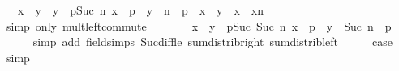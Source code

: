\begin{isabellebody}
\ {\isachardoublequoteopen}{\isachardot}{\kern0pt}{\isachardot}{\kern0pt}{\isachardot}{\kern0pt}\ {\isacharequal}{\kern0pt}\ {\isacharparenleft}{\kern0pt}x\ {\isacharminus}{\kern0pt}\ y{\isacharparenright}{\kern0pt}\ {\isacharasterisk}{\kern0pt}\ {\isacharparenleft}{\kern0pt}y\ {\isacharasterisk}{\kern0pt}\ {\isacharparenleft}{\kern0pt}{\isasymSum}p{\isacharless}{\kern0pt}Suc\ n{\isachardot}{\kern0pt}\ {\isacharparenleft}{\kern0pt}x\ {\isacharcircum}{\kern0pt}\ p{\isacharparenright}{\kern0pt}\ {\isacharasterisk}{\kern0pt}\ y\ {\isacharcircum}{\kern0pt}\ {\isacharparenleft}{\kern0pt}n\ {\isacharminus}{\kern0pt}\ p{\isacharparenright}{\kern0pt}{\isacharparenright}{\kern0pt}{\isacharparenright}{\kern0pt}\ {\isacharplus}{\kern0pt}\ {\isacharparenleft}{\kern0pt}x\ {\isacharminus}{\kern0pt}\ y{\isacharparenright}{\kern0pt}\ {\isacharasterisk}{\kern0pt}\ {\isacharparenleft}{\kern0pt}x\ {\isacharasterisk}{\kern0pt}\ x{\isacharcircum}{\kern0pt}n{\isacharparenright}{\kern0pt}{\isachardoublequoteclose}\isanewline
\ \ \ \ \isamarkupfalse%
\ {\isacharparenleft}{\kern0pt}simp\ only{\isacharcolon}{\kern0pt}\ mult{\isachardot}{\kern0pt}left{\isacharunderscore}{\kern0pt}commute{\isacharparenright}{\kern0pt}\isanewline
\ \ \isamarkupfalse%
\ \isamarkupfalse%
\ {\isachardoublequoteopen}{\isachardot}{\kern0pt}{\isachardot}{\kern0pt}{\isachardot}{\kern0pt}\ {\isacharequal}{\kern0pt}\ {\isacharparenleft}{\kern0pt}x\ {\isacharminus}{\kern0pt}\ y{\isacharparenright}{\kern0pt}\ {\isacharasterisk}{\kern0pt}\ {\isacharparenleft}{\kern0pt}{\isasymSum}p{\isacharless}{\kern0pt}Suc\ {\isacharparenleft}{\kern0pt}Suc\ n{\isacharparenright}{\kern0pt}{\isachardot}{\kern0pt}\ x\ {\isacharcircum}{\kern0pt}\ p\ {\isacharasterisk}{\kern0pt}\ y\ {\isacharcircum}{\kern0pt}\ {\isacharparenleft}{\kern0pt}Suc\ n\ {\isacharminus}{\kern0pt}\ p{\isacharparenright}{\kern0pt}{\isacharparenright}{\kern0pt}{\isachardoublequoteclose}\isanewline
\ \ \ \ \isamarkupfalse%
\ {\isacharparenleft}{\kern0pt}simp\ add{\isacharcolon}{\kern0pt}\ field{\isacharunderscore}{\kern0pt}simps\ Suc{\isacharunderscore}{\kern0pt}diff{\isacharunderscore}{\kern0pt}le\ sum{\isacharunderscore}{\kern0pt}distrib{\isacharunderscore}{\kern0pt}right\ sum{\isacharunderscore}{\kern0pt}distrib{\isacharunderscore}{\kern0pt}left{\isacharparenright}{\kern0pt}\isanewline
\ \ \isamarkupfalse%
\ \isamarkupfalse%
\ {\isacharquery}{\kern0pt}case\ \isacommand{{\isachardot}{\kern0pt}}\isamarkupfalse%
\isanewline
{}\isamarkupfalse%
\ simp%

\end{isabellebody}
